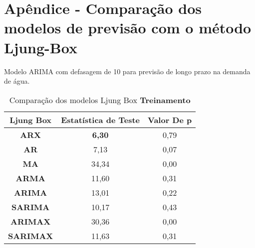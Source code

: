 
\section{Ap\^endice - Compara\c c\~ao dos modelos de previs\~ao com o m\'etodo Ljung-Box}\label{sec:comtb18}



Modelo ARIMA com defasagem de 10 para previsão de longo prazo na demanda de água.

	\begin{table}[H]
		\centering
		\caption{Comparação dos modelos Ljung Box \textbf{Treinamento} }\label{tb:lbtrn}
	\begin{tabular}{@{}ccc@{}}
		\toprule
		\textbf{Ljung Box} & \textbf{Estatística de Teste} & \textbf{Valor De p} \\ \midrule
\textbf{ARX}       & \textbf{6,30}                          & 0,79                \\
\textbf{AR}        & 7,13                          & 0,07                \\
\textbf{MA}        & 34,34                         & 0,00                \\
\textbf{ARMA}      & 11,60                         & 0,31                \\
\textbf{ARIMA}     & 13,01                         & 0,22                \\
\textbf{SARIMA}    & 10,17                         & 0,43                \\
\textbf{ARIMAX}    & 30,36                         & 0,00                \\
\textbf{SARIMAX}   & 11,63                         & 0,31                \\ \bottomrule
	\end{tabular}

	\end{table}


